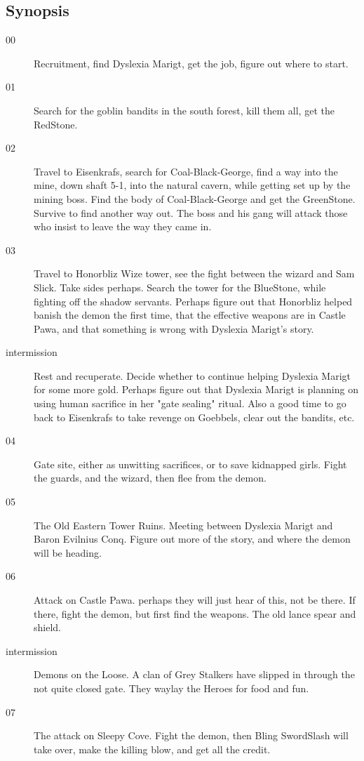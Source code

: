 \subsection*{Synopsis}
\begin{description}

\item[00] Recruitment, find Dyslexia Marigt, get the job, figure out where to start.


\item[01] Search for the goblin bandits in the south forest, kill them all, get the RedStone.


\item[02] Travel to Eisenkrafs, search for Coal-Black-George, find a way into the mine, down shaft 5-1, into the natural cavern, while getting set up by the mining boss. Find the body of Coal-Black-George and get the GreenStone. Survive to find another way out. The boss and his gang will attack those who insist to leave the way they came in.


\item[03] Travel to Honorbliz Wize tower, see the fight between the wizard and Sam Slick. Take sides perhaps. Search the tower for the BlueStone, while fighting off the shadow servants. Perhaps figure out that Honorbliz helped banish the demon the first time, that the effective weapons are in Castle Pawa, and that something is wrong with Dyslexia Marigt's story.


\item[intermission] Rest and recuperate. Decide whether to continue helping Dyslexia Marigt for some more gold. Perhaps figure out that Dyslexia Marigt is planning on using human sacrifice in her "gate sealing" ritual. Also a good time to go back to Eisenkrafs to take revenge on Goebbels, clear out the bandits, etc.


\item[04] Gate site, either as unwitting sacrifices, or to save kidnapped girls. Fight the guards, and the wizard, then flee from the demon.


\item[05] The Old Eastern Tower Ruins. Meeting between Dyslexia Marigt and Baron Evilnius Conq. Figure out more of the story, and where the demon will be heading.


\item[06] Attack on Castle Pawa. perhaps they will just hear of this, not be there. If there, fight the demon, but first find the weapons. The old lance spear and shield.


\item[intermission] Demons on the Loose. A clan of Grey Stalkers have slipped in through the not quite closed gate. They waylay the Heroes for food and fun.


\item[07] The attack on Sleepy Cove. Fight the demon, then Bling SwordSlash will take over, make the killing blow, and get all the credit.

\end{description}



